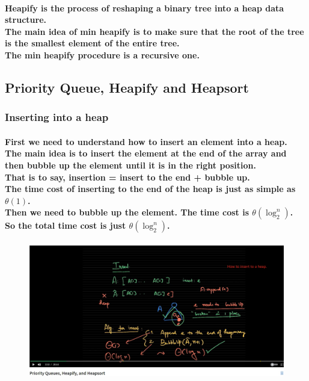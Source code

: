 \documentclass{article}
\begin{document}
\paragraph{Heapify is the process of reshaping a binary tree into a heap data structure.\\
The main idea of min heapify is to make sure that the root of the tree is the smallest element of the entire tree.\\
The min heapify procedure is a recursive one.\\}

\subsection{Priority Queue, Heapify and Heapsort}

\subsubsection{Inserting into a heap}

\paragraph{First we need to understand how to insert an element into a heap.\\
The main idea is to insert the element at the end of the array and then bubble up the element until it is in the right position.\\
That is to say, insertion = insert to the end + bubble up.\\
The time cost of inserting to the end of the heap is just as simple as $\theta(1)$.\\
Then we need to bubble up the element. The time cost is $\theta(\log_2^n)$.\\
So the total time cost is just $\theta(\log_2^n)$.\\}

\begin{figure}[h]
    \includegraphics[width=\textwidth]{inserttoaheap}
\end{figure}
\end{document}
